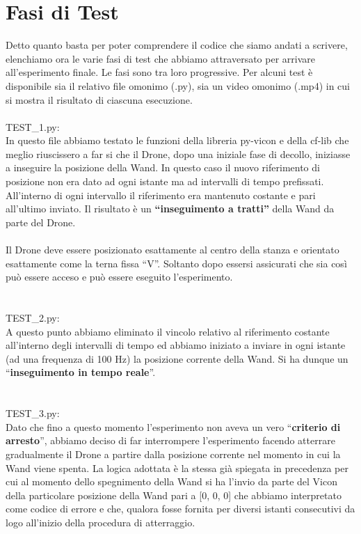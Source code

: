 \chapter*{Fasi di Test}

Detto quanto basta per poter comprendere il codice che siamo andati a scrivere, elenchiamo ora le varie fasi di test che abbiamo attraversato per arrivare all’esperimento finale. Le fasi sono tra loro progressive. Per alcuni test è disponibile sia il relativo file omonimo (.py), sia un video omonimo (.mp4) in cui si mostra il risultato di ciascuna esecuzione. 
\\
\\
TEST\_1.py: 
\\
In questo file abbiamo testato le funzioni della libreria py-vicon e della cf-lib che meglio riuscissero a far si che il Drone, dopo una iniziale fase di decollo, iniziasse a inseguire la posizione della Wand. In questo caso il nuovo riferimento di posizione non era dato ad ogni istante ma ad intervalli di tempo prefissati. All’interno di ogni intervallo il riferimento era mantenuto costante e pari all’ultimo inviato. Il risultato è un \textbf{“inseguimento a tratti”} della Wand da parte del Drone. 
\\
\\
Il Drone deve essere posizionato esattamente al centro della stanza e orientato esattamente come la terna fissa “V”. Soltanto dopo essersi assicurati che sia così può essere acceso e può essere eseguito l’esperimento. 
\\
\\
\\
TEST\_2.py: 
\\
A questo punto abbiamo eliminato il vincolo relativo al riferimento costante all’interno degli intervalli di tempo ed abbiamo iniziato a inviare in ogni istante (ad una frequenza di 100 Hz) la posizione corrente della Wand. Si ha dunque un “\textbf{inseguimento in tempo reale}”. 
\\
\\
\\
TEST\_3.py: 
\\
Dato che fino a questo momento l’esperimento non aveva un vero “\textbf{criterio di arresto}”, abbiamo deciso di far interrompere l’esperimento facendo atterrare gradualmente il Drone a partire dalla posizione corrente nel momento in cui la Wand viene spenta. La logica adottata è la stessa già spiegata in precedenza per cui al momento dello spegnimento della Wand si ha l’invio da parte del Vicon della particolare posizione della Wand pari a  [0, 0, 0] che abbiamo interpretato come codice di errore e che, qualora fosse fornita per diversi istanti consecutivi da logo all’inizio della procedura di atterraggio. 
